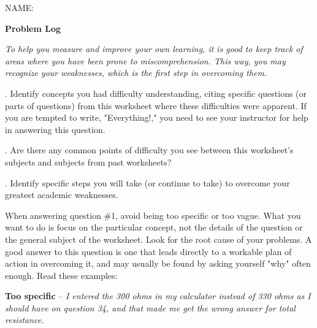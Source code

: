 

\noindent
NAME: \underbar{\hskip 150pt}

\centerline{\bf Problem Log} \medskip

{\it To help you measure and improve your own learning, it is good to keep track of areas where you have been prone to miscomprehension.  This way, you may recognize your weaknesses, which is the first step in overcoming them.}

\vskip 10pt

.  Identify concepts you had difficulty understanding, citing specific questions (or parts of questions) from this worksheet where these difficulties were apparent.  If you are tempted to write, "Everything!," you need to see your instructor for help in answering this question.

\vskip 100pt

.  Are there any common points of difficulty you see between this worksheet's subjects and subjects from past worksheets?

\vskip 100pt

.  Identify specific steps you will take (or continue to take) to overcome your greatest academic weaknesses.

\vskip 100pt







When answering question \#1, avoid being too specific or too vague.  What you want to do is focus on the particular concept, not the details of the question or the general subject of the worksheet.  Look for the root cause of your problems.  A good answer to this question is one that leads directly to a workable plan of action in overcoming it, and may usually be found by asking yourself "why" often enough.  Read these examples:

\vskip 10pt {\narrower \noindent \baselineskip5pt

{\bf Too specific} -- {\it I entered the 300 ohms in my calculator instead of 330 ohms as I should have on question 34, and that made me get the wrong answer for total resistance.}

\par} \vskip 10pt



